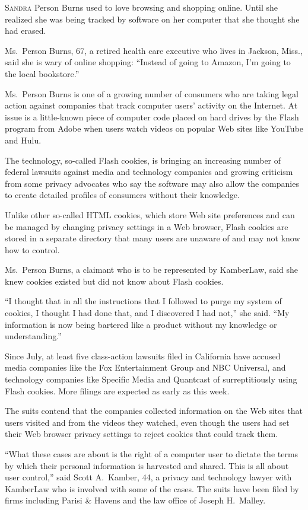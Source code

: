 ﻿\documentclass[12pt]{article}
\begin{document}
\lettrine{S}{andra} Person Burns used to love browsing and shopping online.
Until she realized she was being tracked by software on her computer that she thought she had
erased.

Ms.~Person Burns, 67, a retired health care executive who lives in Jackson, Miss., said she is wary
of online shopping: ``Instead of going to Amazon, I'm going to the local bookstore.''

Ms.~Person Burns is one of a growing number of consumers who are taking legal action against
companies that track computer users' activity on the Internet. At issue is a little-known piece of
computer code placed on hard drives by the Flash program from Adobe when users watch videos on
popular Web sites like YouTube and Hulu.

The technology, so-called Flash cookies, is bringing an increasing number of federal lawsuits
against media and technology companies and growing criticism from some privacy advocates who say the
software may also allow the companies to create detailed profiles of consumers without their
knowledge.

Unlike other so-called HTML cookies, which store Web site preferences and can be managed by changing
privacy settings in a Web browser, Flash cookies are stored in a separate directory that many users
are unaware of and may not know how to control.

Ms.~Person Burns, a claimant who is to be represented by KamberLaw, said she knew cookies existed
but did not know about Flash cookies.

``I thought that in all the instructions that I followed to purge my system of cookies, I thought I
had done that, and I discovered I had not,'' she said. ``My information is now being bartered like a
product without my knowledge or understanding.''

Since July, at least five class-action lawsuits filed in California have accused media companies
like the Fox Entertainment Group and NBC Universal, and technology companies like Specific Media and
Quantcast of surreptitiously using Flash cookies. More filings are expected as early as this week.

The suits contend that the companies collected information on the Web sites that users visited and
from the videos they watched, even though the users had set their Web browser privacy settings to
reject cookies that could track them.

``What these cases are about is the right of a computer user to dictate the terms by which their
personal information is harvested and shared. This is all about user control,'' said Scott
A.~Kamber, 44, a privacy and technology lawyer with KamberLaw who is involved with some of the
cases. The suits have been filed by firms including Parisi \& Havens and the law office of Joseph
H.~Malley.
\end{document}
